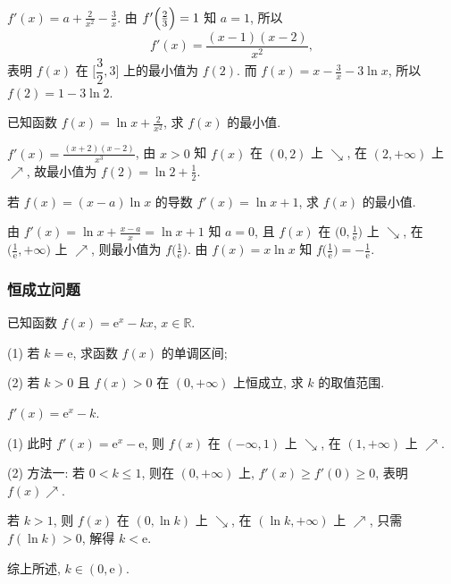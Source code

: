   \beginsolution
    $f'(x)=a+\frac2{x^2}-\frac3x$. 由 $f'\Bigl(\frac23\Bigr)=1$ 知 $a=1$, 所以 
    \[f'(x)=\frac{(x-1)(x-2)}{x^2},\]
    表明 $f(x)$ 在 $\Big[\dfrac32,3\Big]$ 上的最小值为 $f(2)$. 而 $f(x)=x-\frac3x-3\ln x$, 所以 $f(2)=1-3\ln2$.
  \endsolution
  
  \lianxi
  \begin{exercise}
    已知函数 $f(x)=\ln x+ \frac2{x^2}$, 求 $f(x)$ 的最小值.
  \end{exercise}

  \beginsolution
    $f'(x)=\frac{(x+2)(x-2)}{x^3}$, 由 $x>0$ 知 $f(x)$ 在 $(0,2)$ 上 $\searrow$, 在 $(2,+\infty)$ 上 $\nearrow$, 故最小值为 $f(2)=\ln 2+\frac12$.
  \endsolution
  
  \begin{exercise}
    若 $f(x)=(x-a)\ln x$ 的导数 $f'(x)=\ln x+1$, 求 $f(x)$ 的最小值.
  \end{exercise}

  \beginsolution
    由 $f'(x)=\ln x+\frac{x-a}x= \ln x+1$ 知 $a=0$, 且 $f(x)$ 在 $\Big(0,\frac1{\mathrm{e}}\Big)$ 上 $\searrow$, 在 $\Big(\frac1{\mathrm{e}},+\infty\Big)$ 上 $\nearrow$, 则最小值为 $f\Big(\frac1{\mathrm{e}}\Big)$. 由 $f(x)=x\ln x$ 知 $f\Big(\frac1{\mathrm{e}}\Big)=-\frac1{\mathrm{e}}$.
  \endsolution
  
  \subsubsection{恒成立问题}
  \begin{example}
    已知函数 $f(x)=\mathrm{e}^x -kx$, $x\in\mathbb{R}$.
    
    (1) 若 $k=\mathrm{e}$, 求函数 $f(x)$ 的单调区间;
    
    (2) 若 $k>0$ 且 $f(x)>0$ 在 $(0,+\infty)$ 上恒成立, 求 $k$ 的取值范围.
  \end{example}

  \beginsolution
    $f'(x)=\mathrm{e}^x-k$.
    
    (1) 此时 $f'(x)=\mathrm{e}^x-\mathrm{e}$, 则 $f(x)$ 在 $(-\infty,1)$ 上 $\searrow$, 在 $(1,+\infty)$ 上 $\nearrow$.
    
    (2) 方法一: 若 $0<k\leqslant 1$, 则在 $(0,+\infty)$ 上, $f'(x)\geqslant f'(0)\geqslant 0$, 表明 $f(x)\nearrow$.
    
    若 $k>1$, 则 $f(x)$ 在 $(0,\ln k)$ 上 $\searrow$, 在 $(\ln k,+\infty)$ 上 $\nearrow$, 只需 $f(\ln k)>0$, 解得 $k<\mathrm{e}$.
    
    综上所述, $k\in(0,\mathrm{e})$.
    
